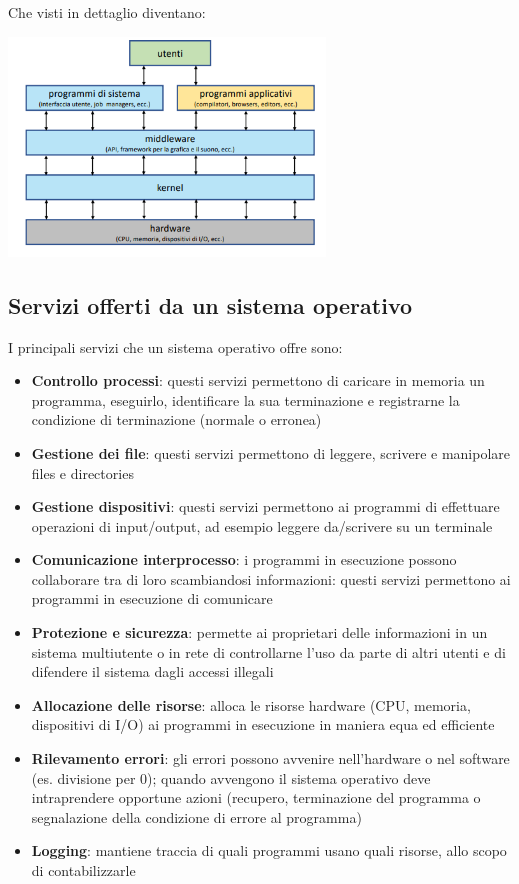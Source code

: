 \documentclass[12pt]{article}
\begin{document}
Che visti in dettaglio diventano:
\begin{center}
    \includegraphics[width = 0.63\textwidth]{Images/3.PNG}
\end{center}
\subsection{Servizi offerti da un sistema operativo}
I principali servizi che un sistema operativo offre sono:
\begin{itemize}
    \item \textbf{Controllo processi}: questi servizi permettono di caricare in memoria un programma, eseguirlo, identificare la sua terminazione e registrarne la condizione di terminazione (normale o erronea)
    \item \textbf{Gestione dei file}: questi servizi permettono di leggere, scrivere e manipolare files e directories
    \item \textbf{Gestione dispositivi}: questi servizi permettono ai programmi di effettuare operazioni di input/output, ad esempio leggere da/scrivere su un terminale
    \item \textbf{Comunicazione interprocesso}: i programmi in esecuzione possono collaborare tra di loro scambiandosi informazioni: questi servizi permettono ai programmi in esecuzione di comunicare
    \item \textbf{Protezione e sicurezza}: permette ai proprietari delle informazioni in un sistema multiutente o in rete di controllarne l'uso da parte di altri utenti e di difendere il sistema dagli accessi illegali
    \item \textbf{Allocazione delle risorse}: alloca le risorse hardware (CPU, memoria, dispositivi di I/O) ai programmi in esecuzione in maniera equa ed efficiente
    \item \textbf{Rilevamento errori}: gli errori possono avvenire nell'hardware o nel software  (es. divisione per 0); quando avvengono il sistema operativo deve intraprendere opportune azioni (recupero, terminazione del programma o segnalazione della condizione di errore al programma)
    \item \textbf{Logging}: mantiene traccia di quali programmi usano quali risorse, allo scopo di contabilizzarle
\end{itemize}
\end{document}
